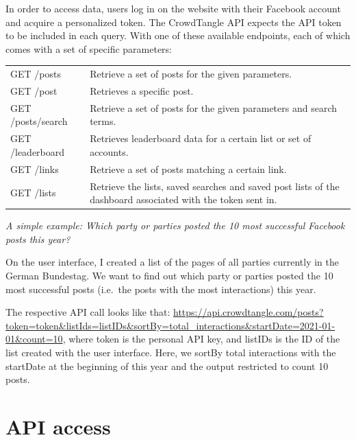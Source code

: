 \documentclass[
]{book}
\begin{document}
In order to access data, users log in on the website with their Facebook account and acquire a personalized token. The CrowdTangle API expects the API token to be included in each query.
With one of these available endpoints, each of which comes with a set of specific parameters:

\begin{longtable}[]{@{}
  >{\raggedright\arraybackslash}p{}
  >{\raggedright\arraybackslash}p{}@{}}
\toprule
\endhead
GET /posts & Retrieve a set of posts for the given parameters. \\
GET /post & Retrieves a specific post. \\
GET /posts/search & Retrieve a set of posts for the given parameters and search terms. \\
GET /leaderboard & Retrieves leaderboard data for a certain list or set of accounts. \\
GET /links & Retrieve a set of posts matching a certain link. \\
GET /lists & Retrieve the lists, saved searches and saved post lists of the dashboard associated with the token sent in. \\
\bottomrule
\end{longtable}

\emph{A simple example: Which party or parties posted the 10 most successful Facebook posts this year?}

On the user interface, I created a list of the pages of all parties currently in the German Bundestag. We want to find out which party or parties posted the 10 most successful posts (i.e.~the posts with the most interactions) this year.

The respective API call looks like that:
\href{\%22https://api.crowdtangle.com/posts?token=token\&listIds=listIDs\&sortBy=total_interactions\&startDate=2021-01-01\&count=10\%22\%5D}{https://api.crowdtangle.com/posts?token=token\&listIds=listIDs\&sortBy=total\_interactions\&startDate=2021-01-01\&count=10}, where token is the personal API key, and listIDs is the ID of the list created with the user interface. Here, we sortBy total interactions with the startDate at the beginning of this year and the output restricted to count 10 posts.

\hypertarget{api-access-2}{%
\section{API access}\label{api-access-2}}
\end{document}

